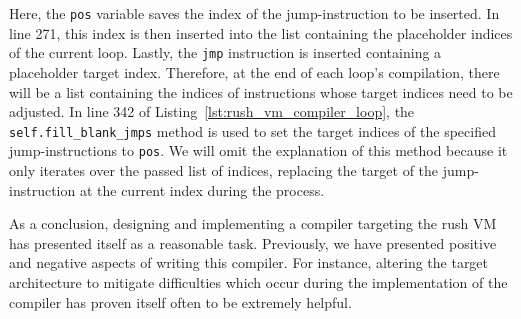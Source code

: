 
Here, the \texttt{pos} variable saves the index of the jump-instruction to be inserted.
In line 271, this index is then inserted into the list containing the placeholder indices of the current loop.
Lastly, the \texttt{jmp} instruction is inserted containing a placeholder target index.
Therefore, at the end of each loop's compilation, there will be a list containing the indices of instructions whose target indices need to be adjusted.
In line 342 of Listing~\ref{lst:rush_vm_compiler_loop}, the \texttt{self.fill\_blank\_jmps} method is used to set the target indices of the specified jump-instructions to \texttt{pos}.
We will omit the explanation of this method because it only iterates over the passed list of indices, replacing the target of the jump-instruction at the current index during the process.

As a conclusion, designing and implementing a compiler targeting the rush VM has presented itself as a reasonable task.
Previously, we have presented positive and negative aspects of writing this compiler.
For instance, altering the target architecture to mitigate difficulties which occur during the implementation of the compiler has proven itself often to be extremely helpful.
